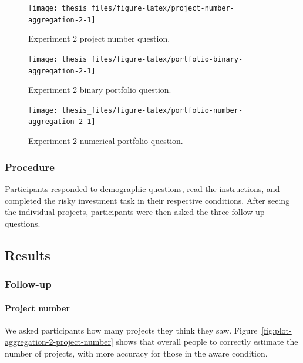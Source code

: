 \documentclass[a4paper, nobind, dvipsnames]{templates/ociamthesis}
\theoremstyle{definition}
\theoremstyle{definition}
\theoremstyle{definition}
\theoremstyle{definition}
\theoremstyle{remark}
\begin{document}
\begin{figure}
\texttt{[image: thesis\_files/figure-latex/project-number-aggregation-2-1]} \caption{Experiment 2 project number question.}\label{fig:project-number-aggregation-2}
\end{figure}



\begin{figure}
\texttt{[image: thesis\_files/figure-latex/portfolio-binary-aggregation-2-1]} \caption{Experiment 2 binary portfolio question.}\label{fig:portfolio-binary-aggregation-2}
\end{figure}



\begin{figure}
\texttt{[image: thesis\_files/figure-latex/portfolio-number-aggregation-2-1]} \caption{Experiment 2 numerical portfolio question.}\label{fig:portfolio-number-aggregation-2}
\end{figure}

\subsubsection{Procedure}

Participants responded to demographic questions, read the instructions, and
completed the risky investment task in their respective conditions. After seeing
the individual projects, participants were then asked the three follow-up
questions.

\hypertarget{results-aggregation-2-appendix}{%
\subsection{Results}\label{results-aggregation-2-appendix}}

\subsubsection{Follow-up}

\paragraph{Project number}

We asked participants how many projects they think they saw.
Figure~\ref{fig:plot-aggregation-2-project-number} shows that overall people
to correctly estimate the number of projects, with more accuracy for those in
the aware condition.
\end{document}
